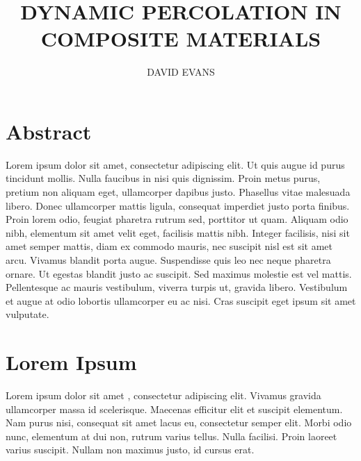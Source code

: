 \documentclass[final]{durchemreport}
\title{DYNAMIC PERCOLATION IN COMPOSITE MATERIALS}
\author{DAVID EVANS}
\begin{document}
    \cleanlookdateon                    %

\maketitle

\section*{Abstract}

Lorem ipsum dolor sit amet, consectetur adipiscing elit. Ut quis augue id purus tincidunt mollis. Nulla faucibus in nisi quis dignissim. Proin metus purus, pretium non aliquam eget, ullamcorper dapibus justo. Phasellus vitae malesuada libero. Donec ullamcorper mattis ligula, consequat imperdiet justo porta finibus. Proin lorem odio, feugiat pharetra rutrum sed, porttitor ut quam. Aliquam odio nibh, elementum sit amet velit eget, facilisis mattis nibh. Integer facilisis, nisi sit amet semper mattis, diam ex commodo mauris, nec suscipit nisl est sit amet arcu. Vivamus blandit porta augue. Suspendisse quis leo nec neque pharetra ornare. Ut egestas blandit justo ac suscipit. Sed maximus molestie est vel mattis. Pellentesque ac mauris vestibulum, viverra turpis ut, gravida libero. Vestibulum et augue at odio lobortis ullamcorper eu ac nisi. Cras suscipit eget ipsum sit amet vulputate.



\newpage
\tableofcontents
\newpage
\listoffigures
\newpage
\listoftables
\newpage
\glsaddall
\printglossary[type=main,title={Acronyms}]
\thispagestyle{empty}
\newpage

\section{Lorem Ipsum}
\label{sec:lorem_ipsum}

Lorem ipsum dolor sit amet \cite{mutiso_electrical_2015}, consectetur adipiscing elit. Vivamus gravida ullamcorper massa id scelerisque. Maecenas efficitur elit et suscipit elementum. Nam purus nisi, consequat sit amet lacus eu, consectetur semper elit. Morbi odio nunc, elementum at dui non, rutrum varius tellus. Nulla facilisi. Proin laoreet varius suscipit. Nullam non maximus justo, id cursus erat.
\end{document}
